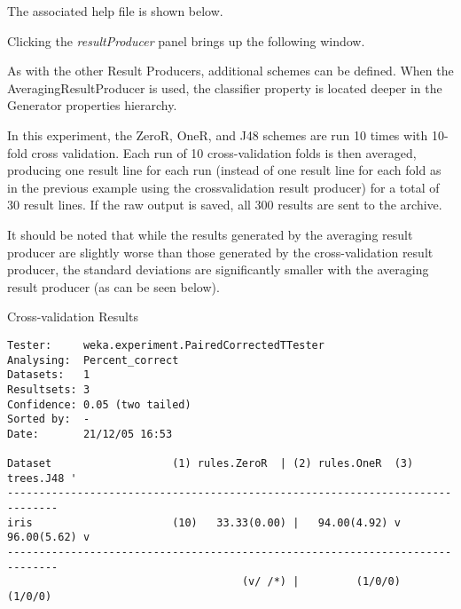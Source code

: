 \documentclass[a4paper]{article}
\begin{document}
The associated help file is shown below.
\begin{center}
\end{center}

Clicking the \textit{resultProducer} panel brings up the following window.
\begin{center}
\end{center}

As with the other Result Producers, additional schemes can be defined. When the AveragingResultProducer is used, the classifier property is located deeper in the Generator properties hierarchy.
\begin{center}
\end{center}
	
\begin{center}
\end{center}

In this experiment, the ZeroR, OneR, and J48 schemes are run 10 times with 10-fold cross validation. Each run of 10 cross-validation folds is then averaged, producing one result line for each run (instead of one result line for each fold as in the previous example using the crossvalidation result producer) for a total of 30 result lines. If the raw output is saved, all 300 results are sent to the archive.
\begin{center}
\end{center}

It should be noted that while the results generated by the averaging result producer are slightly worse than those generated by the cross-validation result producer, the standard deviations are significantly smaller with the averaging result producer (as can be seen below).

Cross-validation Results

\begin{verbatim}
Tester:     weka.experiment.PairedCorrectedTTester
Analysing:  Percent_correct
Datasets:   1
Resultsets: 3
Confidence: 0.05 (two tailed)
Sorted by:  -
Date:       21/12/05 16:53

Dataset                   (1) rules.ZeroR  | (2) rules.OneR  (3) trees.J48 '
------------------------------------------------------------------------------
iris                      (10)   33.33(0.00) |   94.00(4.92) v   96.00(5.62) v
------------------------------------------------------------------------------
                                     (v/ /*) |         (1/0/0)         (1/0/0)
\end{verbatim}
\end{document}
